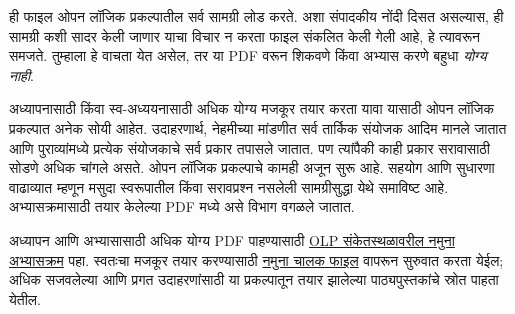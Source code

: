 \documentclass[../include/open-logic-part]{subfiles}
\begin{document}
\clearpage

\begin{editorial}
ही फाइल ओपन लॉजिक प्रकल्पातील सर्व सामग्री लोड करते. अशा
संपादकीय नोंदी दिसत असल्यास, ही सामग्री कशी सादर केली जाणार
याचा विचार न करता फाइल संकलित केली गेली आहे, हे त्यावरून
समजते. तुम्हाला हे वाचता येत असेल, तर या PDF वरून शिकवणे
किंवा अभ्यास करणे बहुधा \emph{योग्य नाही}.

अध्यापनासाठी किंवा स्व-अध्ययनासाठी अधिक योग्य मजकूर तयार
करता यावा यासाठी ओपन लॉजिक प्रकल्पात अनेक सोयी आहेत.
उदाहरणार्थ, नेहमीच्या मांडणीत सर्व तार्किक संयोजक आदिम
मानले जातात आणि पुराव्यांमध्ये प्रत्येक संयोजकाचे सर्व प्रकार
तपासले जातात. पण त्यांपैकी काही प्रकार सरावासाठी सोडणे अधिक
चांगले असते. ओपन लॉजिक प्रकल्पाचे कामही अजून सुरू आहे.
सहयोग आणि सुधारणा वाढाव्यात म्हणून मसुदा स्वरूपातील किंवा
सरावप्रश्न नसलेली सामग्रीसुद्धा येथे समाविष्ट आहे. अभ्यासक्रमासाठी
तयार केलेल्या PDF मध्ये असे विभाग वगळले जातात.

अध्यापन आणि अभ्यासासाठी अधिक योग्य PDF पाहण्यासाठी
\href{http://builds.openlogicproject.org/}{OLP संकेतस्थळावरील नमुना अभ्यासक्रम}
पहा. स्वतःचा मजकूर तयार करण्यासाठी
\href{https://github.com/OpenLogicProject/OpenLogic/tree/master/courses/sample}{नमुना चालक फाइल}
वापरून सुरुवात करता येईल; अधिक सजवलेल्या आणि प्रगत उदाहरणांसाठी
या प्रकल्पातून तयार झालेल्या पाठ्यपुस्तकांचे स्रोत पाहता येतील.
\end{editorial}


















\end{document}

